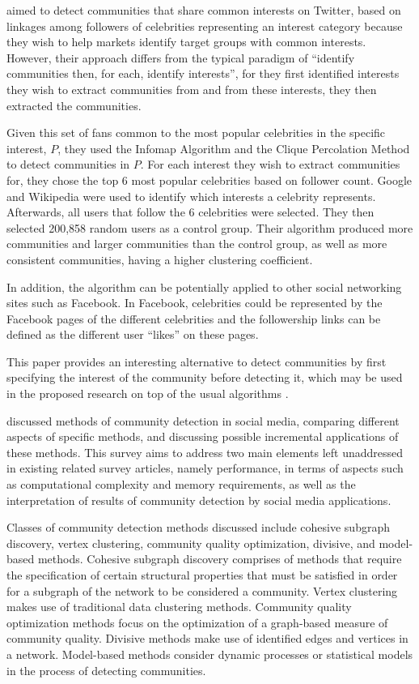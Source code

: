  aimed to detect communities that share common interests on Twitter, based on linkages among followers of celebrities representing an interest category because they wish to help markets identify target groups with common interests. However, their approach differs from the typical  paradigm of ``identify communities then, for each, identify interests'', for they first identified interests they wish to extract communities from and from these interests, they then extracted the communities. 

Given this set of fans common to the most popular celebrities in the specific interest, $P$, they used the Infomap Algorithm and the Clique Percolation Method to detect communities in $P$. For each interest they wish to extract communities for, they chose the top 6 most popular celebrities based on follower count. Google and Wikipedia were used to identify which interests a celebrity represents. Afterwards, all users that follow the 6 celebrities were selected. They then selected 200,858 random users as a control group. Their algorithm produced more communities and larger communities than the control group, as well as more consistent communities, having a higher clustering coefficient. 

In addition, the algorithm can be potentially applied to other social networking sites such as Facebook. In Facebook, celebrities could be represented by the Facebook pages of the different celebrities and the followership links can be defined as the different user ``likes'' on these pages.

This paper provides an interesting alternative to detect communities by first specifying the interest of the community before detecting it, which may be used in the proposed research on top of the usual algorithms \cite{Lim:2012:1}.

 discussed methods of community detection in social media, comparing different aspects of specific methods, and discussing possible incremental applications of these methods. This survey aims to address two main elements left unaddressed in existing related survey articles, namely performance, in terms of aspects such as computational complexity and memory requirements, as well as the interpretation of results of community detection by social media applications.

Classes of community detection methods discussed include cohesive subgraph discovery, vertex clustering, community quality optimization, divisive, and model-based methods. Cohesive subgraph discovery comprises of methods that require the specification of certain structural properties that must be satisfied in order for a subgraph of the network to be considered a community. Vertex clustering makes use of traditional data clustering methods. Community quality optimization methods focus on the optimization of a graph-based measure of community quality. Divisive methods make use of identified edges and vertices in a network. Model-based methods consider dynamic processes or statistical models in the process of detecting communities.

